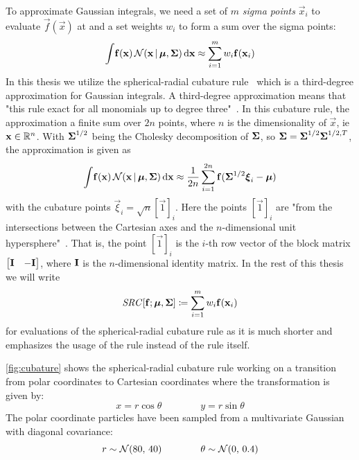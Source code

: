 	To approximate Gaussian integrals, we need a set of \(m\) \emph{sigma points} \( \vec{x}_i \) to evaluate \( \vec{f}(\vec{x}) \) at and a set weights \( w_i \) to form a sum over the sigma points:
	\begin{equation*}
		\int\! \boldsymbol{\mathrm{f}}(\boldsymbol{\mathrm{x}}) \, \mathcal{N}(\boldsymbol{\mathrm{x}} \,\vert\, \boldsymbol{\mathrm{\mu}}, \boldsymbol{\mathrm{\Sigma}}) \dd{\boldsymbol{\mathrm{x}}} \approx \sum_{i = 1}^{m} w_i \boldsymbol{\mathrm{f}}(\boldsymbol{\mathrm{x}}_i)
	\end{equation*}
	In this thesis we utilize the spherical-radial cubature rule~\cite{solinCubatureIntegrationMethods2010} which is a third-degree approximation for Gaussian integrals. A third-degree approximation means that "this rule exact for all monomials up to degree three"~\cite[p. 18]{solinCubatureIntegrationMethods2010}. In this cubature rule, the approximation a finite sum over \( 2n \) points, where \( n \) is the dimensionality of \(\vec{x}\), \ac{ie} \( \boldsymbol{\mathrm{x}} \in \mathbb{R}^n \). With \( \boldsymbol{\mathrm{\Sigma}}^{1/2} \) being the Cholesky decomposition of \( \boldsymbol{\mathrm{\Sigma}} \), so \( \boldsymbol{\mathrm{\Sigma}} = \boldsymbol{\mathrm{\Sigma}}^{1/2} \boldsymbol{\mathrm{\Sigma}}^{1/2, T} \), the approximation is given as
	\begin{equation*}
		\int\! \boldsymbol{\mathrm{f}}(\boldsymbol{\mathrm{x}}) \, \mathcal{N}(\boldsymbol{\mathrm{x}} \,\vert\, \boldsymbol{\mathrm{\mu}}, \boldsymbol{\mathrm{\Sigma}}) \dd{\boldsymbol{\mathrm{x}}} \approx \frac{1}{2n} \sum_{i = 1}^{2n} \boldsymbol{\mathrm{f}}(\boldsymbol{\mathrm{\Sigma}}^{1/2} \boldsymbol{\mathrm{\xi}}_i - \boldsymbol{\mathrm{\mu}})
	\end{equation*}
	with the cubature points \( \vec{\xi}_i = \sqrt{n} [\vec{1}]_i \). Here the points \( [\vec{1}]_i \) are "from the intersections between the Cartesian axes and the \(n\)-dimensional unit hypersphere"~\cite{solinCubatureIntegrationMethods2010}. That is, the point \( [\vec{1}]_i \) is the \(i\)-th row vector of the block matrix \( \begin{bmatrix} \boldsymbol{\mathrm{I}} & -\boldsymbol{\mathrm{I}} \end{bmatrix} \), where \( \boldsymbol{\mathrm{I}} \) is the \(n\)-dimensional identity matrix. In the rest of this thesis we will write
	\begin{equation*}
		\mathit{SRC}[\boldsymbol{\mathrm{f}}; \boldsymbol{\mathrm{\mu}}, \boldsymbol{\mathrm{\Sigma}}] \coloneqq \sum_{i = 1}^{m} w_i \boldsymbol{\mathrm{f}}(\boldsymbol{\mathrm{x}}_i)
	\end{equation*}
	for evaluations of the spherical-radial cubature rule as it is much shorter and emphasizes the usage of the rule instead of the rule itself.

	\autoref{fig:cubature} shows the spherical-radial cubature rule working on a transition from polar coordinates to Cartesian coordinates where the transformation is given by:
	\begin{equation*}
		x = r \cos\theta \qquad\qquad y = r \sin\theta
	\end{equation*}
	The polar coordinate particles have been sampled from a multivariate Gaussian with diagonal covariance:
	\begin{equation*}
		r \sim \mathcal{N}(80,\, 40) \qquad\qquad \theta \sim \mathcal{N}(0,\, 0.4)
	\end{equation*}

